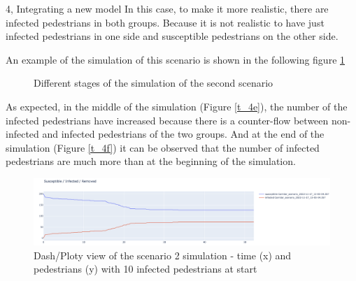\documentclass[10pt,a4paper]{article}
\begin{document}
\begin{task}{4, Integrating a new model}
In this case, to make it more realistic, there are infected pedestrians in both groups. Because it is not realistic to have just infected pedestrians in one side and susceptible pedestrians on the other side.

An example of the simulation of this scenario is shown in the following figure \ref{task4_2}

\begin{figure} [H]
    \centering
        \caption{Different stages of the simulation of the second scenario}
        \label{task4_2}
\end{figure}

As expected, in the middle of the simulation (Figure \ref{t_4e}), the number of the infected pedestrians have increased because there is a counter-flow between non-infected and infected pedestrians of the two groups. And at the end of the simulation (Figure \ref{t_4f}) it can be observed that the number of infected pedestrians are much more than at the beginning of the simulation.  

\begin{figure} [H]
    \includegraphics[width=15cm]{images/plot3.png}
    \centering
    \caption{Dash/Ploty view of the scenario 2 simulation - time (x) and pedestrians (y) with 10 infected pedestrians at start}
    \label{plot3}
\end{figure}


\end{task}
\end{document}
